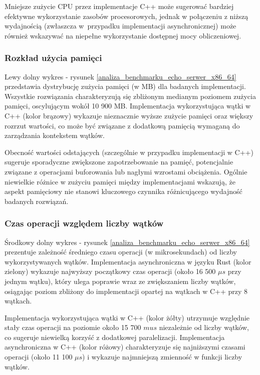 Mniejsze zużycie CPU przez implementacje C++ może sugerować bardziej efektywne wykorzystanie zasobów procesorowych, jednak w połączeniu z niższą wydajnością (zwłaszcza w~przypadku implementacji asynchronicznej) może również wskazywać na niepełne wykorzystanie dostępnej mocy obliczeniowej.

\subsubsection{Rozkład użycia pamięci}
Lewy dolny wykres - rysunek \ref{analiza_benchmarku_echo_serwer_x86_64} przedstawia dystrybucję zużycia pamięci (w MB) dla badanych implementacji. Wszystkie rozwiązania charakteryzują się zbliżonym medianym poziomem zużycia pamięci, oscylującym wokół 10 900 MB. Implementacja wykorzystująca wątki w C++ (kolor brązowy) wykazuje nieznacznie wyższe zużycie pamięci oraz większy rozrzut wartości, co może być związane z dodatkową pamięcią wymaganą do zarządzania kontekstem wątków.

Obecność wartości odstających (szczególnie w przypadku implementacji w C++) sugeruje sporadyczne zwiększone zapotrzebowanie na pamięć, potencjalnie związane z operacjami buforowania lub nagłymi wzrostami obciążenia. Ogólnie niewielkie różnice w zużyciu pamięci między implementacjami wskazują, że aspekt pamięciowy nie stanowi kluczowego czynnika różnicującego wydajność badanych rozwiązań.

\subsubsection{Czas operacji względem liczby wątków}
Środkowy dolny wykres - rysunek \ref{analiza_benchmarku_echo_serwer_x86_64} prezentuje zależność średniego czasu operacji (w mikrosekundach) od liczby wykorzystywanych wątków. Implementacja asynchroniczna w języku Rust (kolor zielony) wykazuje najwyższy początkowy czas operacji (około 16 500 $\mu s$ przy jednym wątku), który ulega poprawie wraz ze zwiększaniem liczby wątków, osiągając poziom zbliżony do implementacji opartej na wątkach w C++ przy 8 wątkach.

Implementacja wykorzystująca wątki w C++ (kolor żółty) utrzymuje względnie stały czas operacji na poziomie około 15 700 $
mu s$ niezależnie od liczby wątków, co sugeruje niewielką korzyść z dodatkowej paralelizacji. Implementacja asynchroniczna w C++ (kolor różowy) charakteryzuje się najniższymi czasami operacji (około 11 100 $\mu s$) i wykazuje najmniejszą zmienność w funkcji liczby wątków.

